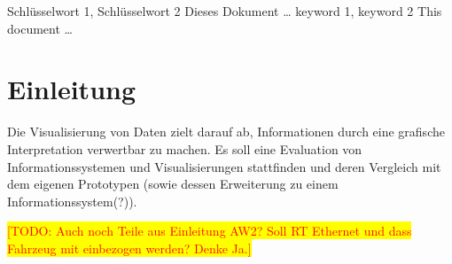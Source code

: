 \documentclass[draft=false
              ,paper=a4
              ,twoside=false
              ,fontsize=11pt
              ,headsepline
              ,BCOR10mm
              ,DIV11
              ]{scrbook}
\newcommand{\TODO}[1]{\colorbox{yellow}{\textcolor{red}{[TODO: #1]}}}
\begin{document}


\frontmatter

\maketitle

\onehalfspacing

\HAWAbstractPage
{Schlüsselwort 1, Schlüsselwort 2}%
{Dieses Dokument \ldots}
{keyword 1, keyword 2}%
{This document \ldots}

\newpage
\singlespacing

\tableofcontents
\newpage
\listoffigures

\mainmatter
\onehalfspacing

\chapter{Einleitung} %
\label{cha:einleitung}
Die Visualisierung von Daten zielt darauf ab, Informationen durch eine grafische Interpretation verwertbar zu machen.
\iffalse
Es soll eine Evaluation von Informationssystemen und Visualisierungen stattfinden und deren Vergleich mit dem eigenen Prototypen (sowie dessen Erweiterung zu einem Informationssystem(?)). 

\TODO{Auch noch Teile aus Einleitung AW2? Soll RT Ethernet und dass Fahrzeug mit einbezogen werden? Denke Ja.}
\end{document}
